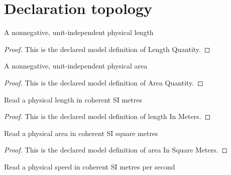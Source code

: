 \section{Declaration topology}
\begin{definition}
  \label{def:physics:phyx-mini-0566:phyxminiproblems-problemphyxmini0566-lengthquantity}
  A nonnegative, unit-independent physical length
\end{definition}
\begin{proof}
  This is the declared model definition of Length Quantity.
\end{proof}
\begin{definition}
  \label{def:physics:phyx-mini-0566:phyxminiproblems-problemphyxmini0566-areaquantity}
  A nonnegative, unit-independent physical area
\end{definition}
\begin{proof}
  This is the declared model definition of Area Quantity.
\end{proof}
\begin{definition}
  \label{def:physics:phyx-mini-0566:phyxminiproblems-problemphyxmini0566-lengthinmeters}
  Read a physical length in coherent SI metres
\end{definition}
\begin{proof}
  This is the declared model definition of length In Meters.
\end{proof}
\begin{definition}
  \label{def:physics:phyx-mini-0566:phyxminiproblems-problemphyxmini0566-areainsquaremeters}
  Read a physical area in coherent SI square metres
\end{definition}
\begin{proof}
  This is the declared model definition of area In Square Meters.
\end{proof}
\begin{definition}
  \label{def:physics:phyx-mini-0566:phyxminiproblems-problemphyxmini0566-speedinmeterspersecond}
  Read a physical speed in coherent SI metres per second
\end{definition}

